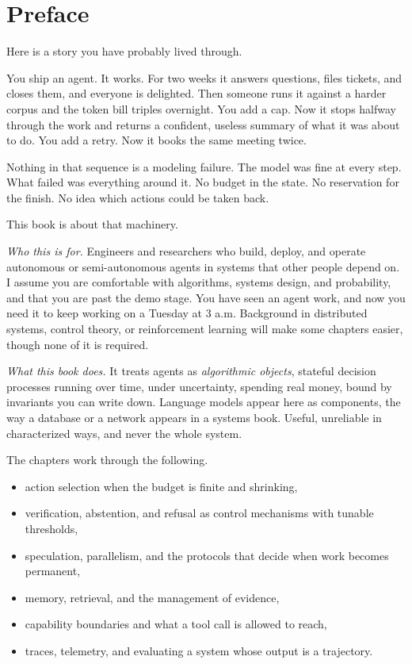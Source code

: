\chapter*{Preface}

Here is a story you have probably lived through.

You ship an agent. It works. For two weeks it answers questions, files tickets,
and closes them, and everyone is delighted. Then someone runs it against a
harder corpus and the token bill triples overnight. You add a cap. Now it stops
halfway through the work and returns a confident, useless summary of what it
was about to do. You add a retry. Now it books the same meeting twice.

Nothing in that sequence is a modeling failure. The model was fine at every
step. What failed was everything around it. No budget in the state. No reservation for the finish. No idea which actions could be taken back.

This book is about that machinery.

\vspace{1em}
\noindent
\textit{Who this is for.}
Engineers and researchers who build, deploy, and operate autonomous or
semi-autonomous agents in systems that other people depend on. I assume you are
comfortable with algorithms, systems design, and probability, and that you are
past the demo stage. You have seen an agent work, and now you need it to keep
working on a Tuesday at 3 a.m. Background in distributed systems, control
theory, or reinforcement learning will make some chapters easier, though none of
it is required.

\vspace{0.5em}
\noindent
\textit{What this book does.}
It treats agents as \emph{algorithmic objects}, stateful decision processes
running over time, under uncertainty, spending real money, bound by invariants
you can write down. Language models appear here as components, the way a
database or a network appears in a systems book. Useful, unreliable in
characterized ways, and never the whole system.

The chapters work through the following.
\begin{itemize}
\item action selection when the budget is finite and shrinking,
\item verification, abstention, and refusal as control mechanisms with tunable thresholds,
\item speculation, parallelism, and the protocols that decide when work becomes permanent,
\item memory, retrieval, and the management of evidence,
\item capability boundaries and what a tool call is allowed to reach,
\item traces, telemetry, and evaluating a system whose output is a trajectory.
\end{itemize}

